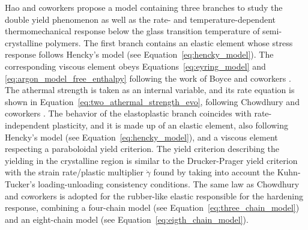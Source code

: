 Hao and coworkers \citep{haoRatedependentConstitutiveModel2022} propose a model containing three branches to study the double yield phenomenon as well as the rate- and temperature-dependent thermomechanical response below the glass transition temperature of semi-crystalline polymers.
The first branch contains an elastic element whose stress response follows Hencky's model (see Equation~\eqref{eq:hencky_model}).
The corresponding viscous element obeys Equations~\eqref{eq:eyring_model} and \eqref{eq:argon_model_free_enthalpy} following the work of Boyce and coworkers \citep{boyceLargeInelasticDeformation1988}.
The athermal strength is taken as an internal variable, and its rate equation is shown in Equation~\eqref{eq:two_athermal_strength_evo}, following Chowdhury and coworkers \citep{chowdhuryEffectsManufacturingInducedVoids2008}.
The behavior of the elastoplastic branch coincides with rate-independent plasticity, and it is made up of an elastic element, also following Hencky's model (see Equation~\eqref{eq:hencky_model}), and a viscous element respecting a paraboloidal yield criterion.
The yield criterion describing the yielding in the crystalline region is similar to the Drucker-Prager yield criterion with the strain rate/plastic multiplier $\dot \gamma$ found by taking into account the Kuhn-Tucker's loading-unloading consistency conditions.
The same law as Chowdhury and coworkers \citep{chowdhuryEffectsManufacturingInducedVoids2008} is adopted for the rubber-like elastic responsible for the hardening response, combining a  four-chain model (see Equation~\eqref{eq:three_chain_model}) and an eight-chain model (see Equation~\eqref{eq:eigth_chain_model}).

